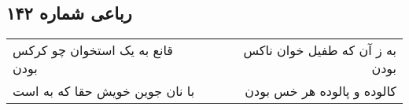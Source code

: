 \begin{center}
\section*{رباعی شماره ۱۴۲}
\label{sec:sh142}
\begin{longtable}{l p{0.5cm} r}
قانع به یک استخوان چو کرکس بودن
&&
به ز آن که طفیل خوان ناکس بودن
\\
با نان جوین خویش حقا که به است
&&
کالوده و پالوده هر خس بودن
\\
\end{longtable}
\end{center}
